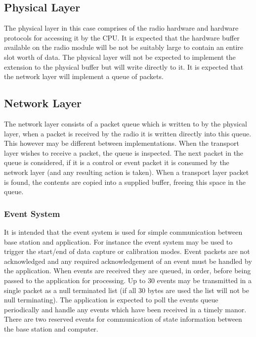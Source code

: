 \documentclass[parskip]{cs4rep}
\begin{document}
\subsection{Physical Layer}

The physical layer in this case comprises of the radio hardware and hardware protocols for accessing it by the CPU. It is expected that the hardware buffer available on the radio module will be not be suitably large to contain an entire slot worth of data. The physical layer will not be expected to implement the extension to the physical buffer but will write directly to it. It is expected that the network layer will implement a queue of packets.

\subsection{Network Layer}

The network layer consists of a packet queue which is written to by the physical layer, when a packet is received by the radio it is written directly into this queue. This however may be different between implementations. When the transport layer wishes to receive a packet, the queue is inspected. The next packet in the queue is considered, if it is a control or event packet it is consumed by the network layer (and any resulting action is taken). When a transport layer packet is found, the contents are copied into a supplied buffer, freeing this space in the queue.

\subsubsection{Event System}

It is intended that the event system is used for simple communication between base station and application. For instance the event system may be used to trigger the start/end of data capture or calibration modes. Event packets are not acknowledged and any required acknowledgement of an event must be handled by the application. When events are received they are queued, in order, before being passed to the application for processing. Up to 30 events may be transmitted in a single packet as a null terminated list (if all 30 bytes are used the list will not be null terminating). The application is expected to poll the events queue periodically and handle any events which have been received in a timely manor. There are two reserved events for communication of state information between the base station and computer.
\end{document}
